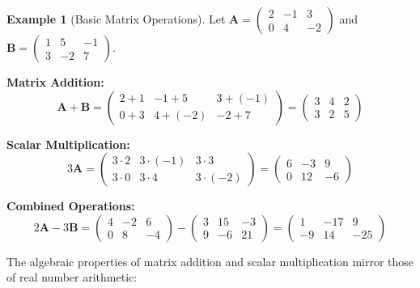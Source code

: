 \documentclass[12pt]{article}
\numberwithin{equation}{section}
\newcommand{\mat}[1]{\mathbf{#1}}        %
\theoremstyle{plain}
\theoremstyle{definition}
\newtheorem{example}[theorem]{Example}
\theoremstyle{remark}
\begin{document}
\begin{example}[Basic Matrix Operations]
Let $\mat{A} = \begin{pmatrix} 2 & -1 & 3 \\ 0 & 4 & -2 \end{pmatrix}$ and $\mat{B} = \begin{pmatrix} 1 & 5 & -1 \\ 3 & -2 & 7 \end{pmatrix}$.

\textbf{Matrix Addition:}
$$\mat{A} + \mat{B} = \begin{pmatrix} 2+1 & -1+5 & 3+(-1) \\ 0+3 & 4+(-2) & -2+7 \end{pmatrix} = \begin{pmatrix} 3 & 4 & 2 \\ 3 & 2 & 5 \end{pmatrix}$$

\textbf{Scalar Multiplication:}
$$3\mat{A} = \begin{pmatrix} 3 \cdot 2 & 3 \cdot (-1) & 3 \cdot 3 \\ 3 \cdot 0 & 3 \cdot 4 & 3 \cdot (-2) \end{pmatrix} = \begin{pmatrix} 6 & -3 & 9 \\ 0 & 12 & -6 \end{pmatrix}$$

\textbf{Combined Operations:}
$$2\mat{A} - 3\mat{B} = \begin{pmatrix} 4 & -2 & 6 \\ 0 & 8 & -4 \end{pmatrix} - \begin{pmatrix} 3 & 15 & -3 \\ 9 & -6 & 21 \end{pmatrix} = \begin{pmatrix} 1 & -17 & 9 \\ -9 & 14 & -25 \end{pmatrix}$$
\end{example}

The algebraic properties of matrix addition and scalar multiplication mirror those of real number arithmetic:
\end{document}
